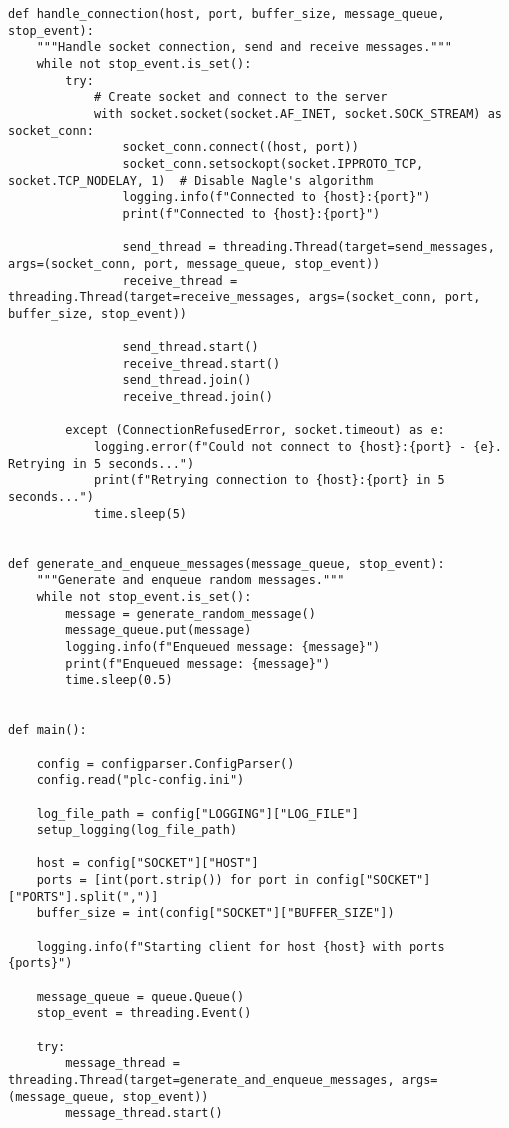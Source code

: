 \begin{listing}[h!]
\begin{verbatim}
def handle_connection(host, port, buffer_size, message_queue, stop_event):
    """Handle socket connection, send and receive messages."""
    while not stop_event.is_set():
        try:
            # Create socket and connect to the server
            with socket.socket(socket.AF_INET, socket.SOCK_STREAM) as socket_conn:
                socket_conn.connect((host, port))
                socket_conn.setsockopt(socket.IPPROTO_TCP, socket.TCP_NODELAY, 1)  # Disable Nagle's algorithm
                logging.info(f"Connected to {host}:{port}")
                print(f"Connected to {host}:{port}")
 
                send_thread = threading.Thread(target=send_messages, args=(socket_conn, port, message_queue, stop_event))
                receive_thread = threading.Thread(target=receive_messages, args=(socket_conn, port, buffer_size, stop_event))
 
                send_thread.start()
                receive_thread.start() 
                send_thread.join()
                receive_thread.join()

        except (ConnectionRefusedError, socket.timeout) as e:
            logging.error(f"Could not connect to {host}:{port} - {e}. Retrying in 5 seconds...")
            print(f"Retrying connection to {host}:{port} in 5 seconds...")
            time.sleep(5)


def generate_and_enqueue_messages(message_queue, stop_event):
    """Generate and enqueue random messages."""
    while not stop_event.is_set():
        message = generate_random_message()
        message_queue.put(message)
        logging.info(f"Enqueued message: {message}")
        print(f"Enqueued message: {message}")
        time.sleep(0.5) 


def main(): 

    config = configparser.ConfigParser()
    config.read("plc-config.ini")
 
    log_file_path = config["LOGGING"]["LOG_FILE"]
    setup_logging(log_file_path)
 
    host = config["SOCKET"]["HOST"]
    ports = [int(port.strip()) for port in config["SOCKET"]["PORTS"].split(",")]
    buffer_size = int(config["SOCKET"]["BUFFER_SIZE"])

    logging.info(f"Starting client for host {host} with ports {ports}")
 
    message_queue = queue.Queue()
    stop_event = threading.Event()

    try: 
        message_thread = threading.Thread(target=generate_and_enqueue_messages, args=(message_queue, stop_event))
        message_thread.start()


\end{verbatim}
\end{listing}
